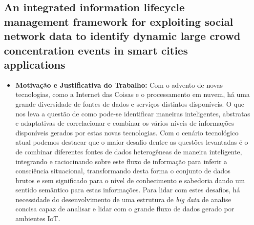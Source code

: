 \documentclass[tid,table]{texufpel} %
\begin{document}
\subsection{An integrated information lifecycle management framework for exploiting social network data to identify dynamic large crowd concentration events in smart cities applications}

\begin{itemize}
	\item \textbf{Motivação e Justificativa do Trabalho:} Com o advento de novas tecnologias, como a Internet das Coisas e o processamento em nuvem, há uma grande diversidade de fontes de dados e serviços distintos disponíveis. O que nos leva a questão de como pode-se identificar maneiras inteligentes, abstratas e adaptativas de correlacionar e combinar os vários níveis de informações disponíveis gerados por estas novas tecnologias. Com o cenário tecnológico atual podemos destacar que o maior desafio dentre as questões levantadas é o de combinar diferentes fontes de dados heterogêneas de maneira inteligente, integrando e raciocinando sobre este fluxo de informação para inferir a consciência situacional, transformando desta forma o conjunto de dados brutos e sem significado para o nível de conhecimento e sabedoria dando um sentido semântico para estas informações. Para lidar com estes desafios, há necessidade do desenvolvimento de uma estrutura de \textit{big data} de analise concisa capaz de analisar e lidar com o grande fluxo de dados gerado por ambientes IoT.	
	

\end{itemize}
\end{document}
